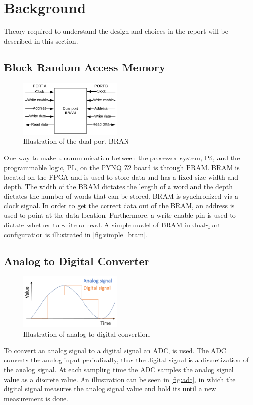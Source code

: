 \documentclass[../report.tex]{subfiles}
\begin{document}
\section{Background} \label{sec:background}
Theory required to understand the design and choices in the report will be described in this section.

\subsection{Block Random Access Memory} \label{subsec:background_bram}
\begin{figure}
    \centering
    \includegraphics[width=0.45\textwidth]{figures/background/dual_port_bram.png}
    \captionsetup{width=0.45\textwidth}
    \caption{Illustration of the dual-port BRAN}
    \label{fig:simple_bram}
\end{figure}
One way to make a communication between the processor system, PS, and the programmable logic, PL, on the PYNQ Z2 board is through BRAM. BRAM is located on the FPGA and is used to store data and has a fixed size width and depth. The width of the BRAM dictates the length of a word and the depth dictates the number of words that can be stored. BRAM is synchronized via a clock signal. In order to get the correct data out of the BRAM, an address is used to point at the data location. Furthermore, a write enable pin is used to dictate whether to write or read. A simple model of BRAM in dual-port configuration is illustrated in \autoref{fig:simple_bram}.

\subsection{Analog to Digital Converter} \label{subsec:background_adc}
\begin{figure}
    \centering
    \includegraphics[width=0.45\textwidth]{figures/background/adc.png}
    \captionsetup{width=0.45\textwidth}
    \caption{Illustration of analog to digital convertion.}
    \label{fig:adc}
\end{figure}
To convert an analog signal to a digital signal an ADC, is used. The ADC converts the analog input periodically, thus the digital signal is a discretization of the analog signal. At each sampling time the ADC samples the analog signal value as a discrete value. An illustration can be seen in \autoref{fig:adc}, in which the digital signal measures the analog signal value and hold its until a new measurement is done.
\end{document}
